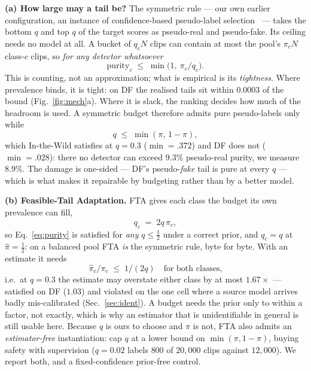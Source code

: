 \documentclass[10pt,letterpaper]{article}
\begin{document}
\textbf{(a) How large may a tail be?} The symmetric rule --- our own earlier
configuration, an instance of confidence-based pseudo-label
selection~\cite{fixmatch,shot} --- takes the bottom $q$ and top $q$ of the target
scores as pseudo-real and pseudo-fake. Its ceiling needs no model at all. A
bucket of $q_cN$ clips can contain at most the pool's $\pi_cN$ class-$c$ clips,
so \emph{for any detector whatsoever}
\begin{equation}
\mathrm{purity}_c\;\le\;\min\!\big(1,\ \pi_c/q_c\big).
\label{eq:purity}
\end{equation}
This is counting, not an approximation; what is empirical is its
\emph{tightness}. Where prevalence binds, it is tight: on DF the realised tails
sit within $0.0003$ of the bound (Fig.~\ref{fig:mech}a). Where it is slack, the
ranking decides how much of the headroom is used. A symmetric budget therefore admits pure
pseudo-labels only while
\begin{equation}
q\;\le\;\min(\pi,\,1-\pi),
\label{eq:valid}
\end{equation}
which In-the-Wild satisfies at $q{=}0.3$ ($\min{=}.372$) and DF does not
($\min{=}.028$): there no detector can exceed $9.3\%$ pseudo-real purity, we
measure $8.9\%$. The damage is one-sided --- DF's pseudo-\emph{fake} tail is pure
at every $q$ --- which is what makes it repairable by budgeting rather than by a
better model.

\textbf{(b) Feasible-Tail Adaptation.} FTA gives each class the budget its own
prevalence can fill,
\begin{equation}
q_c\;=\;2q\,\hat\pi_c,
\label{eq:fta}
\end{equation}
so Eq.~\eqref{eq:purity} is satisfied for \emph{any} $q\le\tfrac12$ under a
correct prior, and $q_c{=}q$ at $\hat\pi{=}\tfrac12$: on a balanced pool FTA
\emph{is} the symmetric rule, byte for byte. With an estimate it needs
\begin{equation}
\hat\pi_c/\pi_c\;\le\;1/(2q)\quad\text{for both classes,}
\label{eq:tol}
\end{equation}
i.e.\ at $q{=}0.3$ the estimate may overstate either class by at most
$1.67\times$ --- satisfied on DF ($1.03$) and violated on the one cell where a
source model arrives badly mis-calibrated (Sec.~\ref{sec:ident}). A budget needs
the prior only to within a factor, not exactly, which is why an estimator that is
unidentifiable in general is still usable here. Because $q$ is
ours to choose and $\pi$ is not, FTA also admits an \emph{estimator-free}
instantiation: cap $q$ at a lower bound on $\min(\pi,1{-}\pi)$, buying safety
with supervision ($q{=}0.02$ labels $800$ of $20{,}000$ clips against
$12{,}000$). We report both, and a fixed-confidence prior-free control.
\end{document}
